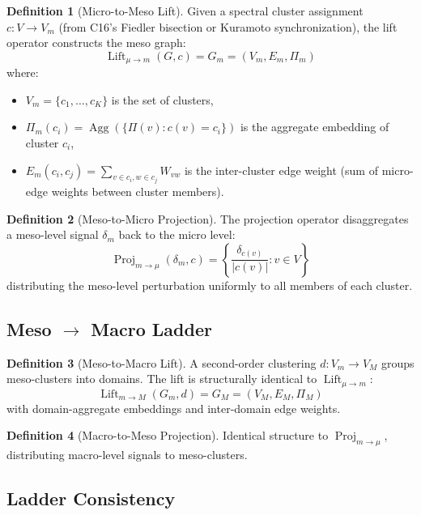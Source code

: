 \documentclass[11pt,a4paper,twoside]{article}
\theoremstyle{definition}
\newtheorem{definition}{Definition}[section]
\theoremstyle{plain}
\theoremstyle{remark}
\DeclareMathOperator{\Lift}{Lift}
\DeclareMathOperator{\Proj}{Proj}
\DeclareMathOperator{\Agg}{Agg}
\newcommand{\abs}[1]{\left\lvert #1 \right\rvert}
\begin{document}
\begin{definition}[Micro-to-Meso Lift]\label{def:m2mlift}
Given a spectral cluster assignment $c: V \to V_m$ (from C16's Fiedler
bisection or Kuramoto synchronization), the lift operator constructs
the meso graph:
\[
  \Lift_{\mu \to m}(G, c) = G_m = (V_m, E_m, \Pi_m)
\]
where:
\begin{itemize}[nosep]
  \item $V_m = \{c_1, \ldots, c_K\}$ is the set of clusters,
  \item $\Pi_m(c_i) = \Agg(\{\Pi(v) : c(v) = c_i\})$ is the aggregate
        embedding of cluster $c_i$,
  \item $E_m(c_i, c_j) = \sum_{v \in c_i, w \in c_j} W_{vw}$ is the
        inter-cluster edge weight (sum of micro-edge weights between
        cluster members).
\end{itemize}
\end{definition}

\begin{definition}[Meso-to-Micro Projection]\label{def:m2mproj}
The projection operator disaggregates a meso-level signal $\delta_m$
back to the micro level:
\[
  \Proj_{m \to \mu}(\delta_m, c) =
  \left\{
    \frac{\delta_{c(v)}}{\abs{c(v)}} : v \in V
  \right\}
\]
distributing the meso-level perturbation uniformly to all members of
each cluster.
\end{definition}

\subsection{Meso $\to$ Macro Ladder}

\begin{definition}[Meso-to-Macro Lift]\label{def:meso2macro}
A second-order clustering $d: V_m \to V_M$ groups meso-clusters into
domains. The lift is structurally identical to $\Lift_{\mu \to m}$:
\[
  \Lift_{m \to M}(G_m, d) = G_M = (V_M, E_M, \Pi_M)
\]
with domain-aggregate embeddings and inter-domain edge weights.
\end{definition}

\begin{definition}[Macro-to-Meso Projection]\label{def:macro2meso}
Identical structure to $\Proj_{m \to \mu}$, distributing macro-level
signals to meso-clusters.
\end{definition}

\subsection{Ladder Consistency}
\end{document}
